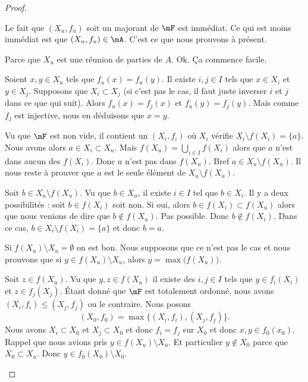 \begin{proof}
\begin{subproof}
		Le fait que \( (X_u,f_u)\) soit un majorant de \( \mF\) est immédiat. Ce qui est moins immédiat est que \( (X_u,f_u)\in \mA\). C'est ce que nous prouvons à présent.

		\begin{subproof}
			\spitem[\( X_u\subset A\)]
			Parce que \( X_u\) est une réunion de parties de \( A\). Ok. Ça commence facile.

			Soient \( x,y\in X_u\) tels que \( f_u(x)=f_u(y)\). Il existe \( i,j\in I\) tels que \( x\in X_i\) et \( y\in X_j\). Supposons que \( X_i\subset X_j\) (si c'est pas le cas, il faut juste inverser \( i\) et \( j\) dans ce que qui suit). Alors \( f_u(x)=f_j(x)\) et \( f_u(y)=f_j(y)\). Mais comme \( f_j\) est injective, nous en déduisons que \( x=y\).

			\spitem[\( X_u\setminus f_u(X_u)=\lbrace a\rbrace\)]
			Vu que \( \mF\) est non vide, il contient un \( (X_i,f_i)\) où \( X_i\) vérifie \( X_i\setminus f(X_i)=\{ a \}\). Nous avons alors \( a\in X_i\subset X_u\). Mais \( f(X_u)=\bigcup_{i\in I}f(X_i)\) alors que \( a\) n'est dans aucun des \( f(X_i)\). Donc \( a\) n'est pas dans \( f(X_u)\). Bref \( a\in X_u\setminus f(X_u)\). Il nous reste à prouver que \( a\) est le seule élément de \( X_u\setminus f(X_u)\).

			Soit \( b\in X_u\setminus f(X_u)\). Vu que \( b\in X_u\), il existe \( i\in I\) tel que \( b\in X_i\). Il y a deux possibilités : soit \( b\in f(X_i)\) soit non. Si oui, alors \( b\in f(X_i)\subset f(X_u)\) alors que nous venions de dire que \( b\not\in f(X_u)\). Pas possible. Donc \( b\not\in f(X_i)\). Dans ce cas, \( b\in X_i\setminus f(X_i)=\{ a \}\) et donc \( b=a\).

			\spitem[\( f(X_u)\setminus X_u=\emptyset\) ou \( f(X_u)\setminus X_u=\max\big( f(X_u) \big)\)]
			Si \( f(X_u)\setminus X_u=\emptyset\) on est bon. Nous supposons que ce n'est pas le cas et nous prouvons que si \( y\in f(X_u)\setminus X_u\), alors \( y=\max\big( f(X_u) \big)\).

			Soit \( z\in f(X_u)\). Vu que \( y,z\in f(X_u)\) il existe des \( i,j\in I\) tels que \( y\in f_i(X_i)\) et \( z\in f_j(X_j)\). Étant donné que \( \mF\) est totalement ordonné, nous avons \( (X_i,f_i)\leq (X_j,f_j)\) ou le contraire. Nous posons
			\begin{equation}
				(X_0,f_0)=\max\big\{ (X_i,f_i),(X_j,f_j) \big\}.
			\end{equation}
			Nous avons \( X_i\subset X_0\) et \( X_j\subset X_0\) et donc \( f_i=f_j\) sur \( X_0\) et donc \( x,y\in f_0(x_0)\). Rappel que nous avions pris \( y\in f(X_u)\setminus X_u\). Et particulier \( y\not\in X_0\) parce que \( X_0\subset X_u\). Donc \( y\in f_0(X_0)\setminus X_0\).


\end{subproof}
\end{subproof}
\end{proof}
